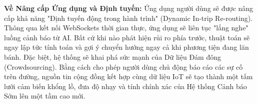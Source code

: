 \textbf{Về Nâng cấp Ứng dụng và Định tuyến:} Ứng dụng người dùng sẽ được nâng cấp khả năng "Định tuyến động trong hành trình" (Dynamic In-trip Re-routing). Thông qua kết nối WebSockets thời gian thực, ứng dụng sẽ liên tục "lắng nghe" luồng cảnh báo từ AI. Bất cứ khi nào phát hiện rủi ro phía trước, thuật toán sẽ ngay lập tức tính toán và gợi ý chuyển hướng ngay cả khi phương tiện đang lăn bánh. Đặc biệt, hệ thống sẽ khai phá sức mạnh của Dữ liệu Đám đông (Crowdsourcing). Bằng cách cho phép người dùng chủ động báo cáo các sự cố trên đường, nguồn tin cộng đồng kết hợp cùng dữ liệu IoT sẽ tạo thành một tấm lưới cảm biến khổng lồ, đưa độ nhạy và tính chính xác của Hệ thống Cảnh báo Sớm lên một tầm cao mới.
